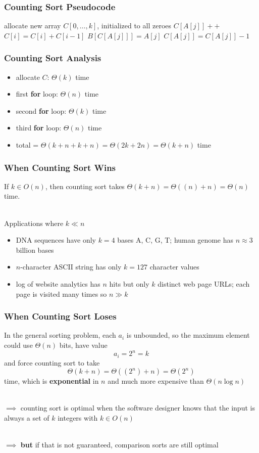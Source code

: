 \documentclass{beamer}
\newcommand{\stanza}{ \\~\ }
\begin{document}
\begin{frame} \frametitle{Counting Sort Pseudocode}
  \begin{algorithmic}[1]
     
    \State allocate new array $C[0, \ldots, k]$, initialized to all zeroes
      \State $C[A[j]]++$ 
    \EndFor
      \State $C[i] = C[i] + C[i-1]$ 
    \EndFor
      \State $B[C[A[j]]] = A[j]$
      \State $C[A[j]] = C[A[j]] - 1$
    \EndFor
    \EndFunction
  \end{algorithmic}
\end{frame}

\begin{frame} \frametitle{Counting Sort Analysis}
\begin{itemize}
  \item allocate $C$: $\Theta(k)$ time
  \item first \textbf{for} loop: $\Theta(n)$ time
  \item second \textbf{for} loop: $\Theta(k)$ time
  \item third \textbf{for} loop: $\Theta(n)$ time
  \item total = $\Theta(k+n+k+n)=\Theta(2k+2n)=\Theta(k+n)$ time
\end{itemize}
\end{frame}

\begin{frame} \frametitle{When Counting Sort Wins}
  If $k \in O(n)$, then counting sort takes $\Theta(k+n)=\Theta((n)+n)=\Theta(n)$ time. \stanza

Applications where $k \ll n$
\begin{itemize}
\item DNA sequences have only $k=4$ bases A, C, G, T; human genome has $n \approx 3$ billion bases
\item $n$-character ASCII string has only $k=127$ character values
\item log of website analytics has $n$ hits but only $k$ distinct web page URLs;
  each page is visited many times so $n \gg k$
\end{itemize}
\end{frame}

\begin{frame} \frametitle{When Counting Sort Loses}
In the general sorting problem, each $a_i$ is unbounded, so the maximum element
could use $\Theta(n)$ bits, have value
\[ a_i = 2^n = k \]
and force counting sort to take
\[ \Theta(k+n)=\Theta((2^n)+n)=\Theta(2^n) \]
time, which is \textbf{exponential} in $n$ and much more expensive than
$\Theta(n \log n)$ \stanza

$\implies$ counting sort is optimal when the software designer knows that the
input is always a set of $k$ integers with $k \in O(n)$ \stanza

$\implies$ \textbf{but} if that is not guaranteed, comparison sorts are still optimal
\end{frame}
\end{document}
